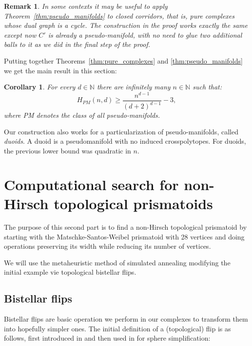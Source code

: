 \documentclass[12pt,a4paper]{article}
\newcommand{\N}{\mathbb N}
\theoremstyle{plain}
\newtheorem{corollary}{Corollary}
\newtheorem*{remark}{Remark}
\theoremstyle{definition}
\begin{document}
\begin{remark}
\label{rem:closed-corridor}
In some contexts it may be useful to apply Theorem~\ref{thm:pseudo_manifolds} to \emph{closed corridors}, that is, pure complexes whose dual graph is a cycle. The construction in the proof works exactly the same except now $C'$ is already a pseudo-manifold, with no need to glue two additional balls to it as we did in the final step of the proof.
\end{remark}

Putting together Theorems~\ref{thm:pure_complexes} and \ref{thm:pseudo_manifolds} we get the main result in this section:

\begin{corollary}
\label{coro:pseudo_manifolds}
For every $d\in \N$ there are infinitely many $n\in\N$ such that:
\[
  H_{PM}(n,d) \ge \frac{n^{d-1}}{(d+2)^{d-1}}-3,
\]
where PM denotes the class of all pseudo-manifolds.
\end{corollary}

Our construction also works for a particularization of pseudo-manifolds, called \emph{duoids}\cite{Todd:duoids}. A duoid is a pseudomanifold with no induced crosspolytopes. For duoids, the previous lower bound was quadratic in $n$.

\section{ Computational search for non-Hirsch topological prismatoids}
\label{sec:prismatoids}
The purpose of this second part is to find a non-Hirsch topological prismatoid by starting with the Matschke-Santos-Weibel prismatoid with 28 vertices and doing operations preserving its width while reducing its number of vertices.

We will use the metaheuristic method of simulated annealing modifying the initial example vie topological bistellar flips.

\subsection{Bistellar flips}
\label{sub:flips}
Bistellar flips are basic operation we perform in our complexes to transform them into hopefully simpler ones. The initial definition of a (topological) flip is as follows, first introduced in  \cite{Pachner} and then used in \cite{Lutz} for sphere simplification:
\end{document}
